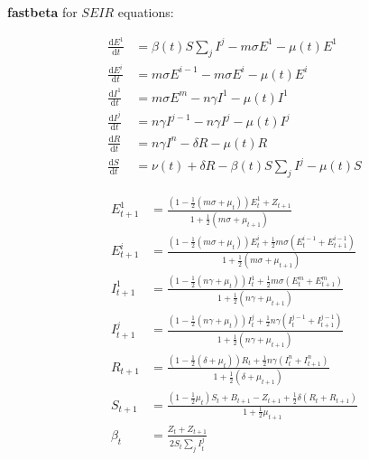 \documentclass{article}
\begin{document}
\setlength{\parindent}{0in}

\textbf{fastbeta} for $S E I R$ equations:

\begin{subequations}
\begin{align}
  \frac{\text{d} E^{1}}{\text{d} t}
  &= \beta(t) S \sum\nolimits_{j} I^{j} - m \sigma E^{1} - \mu(t) E^{1} \\
  \frac{\text{d} E^{i}}{\text{d} t}
  &= m \sigma E^{i-1} - m \sigma E^{i} - \mu(t) E^{i} \\
  \frac{\text{d} I^{1}}{\text{d} t}
  &= m \sigma E^{m} - n \gamma I^{1} - \mu(t) I^{1} \\
  \frac{\text{d} I^{j}}{\text{d} t}
  &= n \gamma I^{j-1} - n \gamma I^{j} - \mu(t) I^{j} \\
  \frac{\text{d} R}{\text{d} t}
  &= n \gamma I^{n} - \delta R - \mu(t) R \\
  \frac{\text{d} S}{\text{d} t}
  &= \nu(t) + \delta R - \beta(t) S \sum\nolimits_{j} I^{j} - \mu(t) S
\end{align}
\end{subequations}

\begin{subequations}
\begin{align}
  E_{t+1}^{1} &= \frac{(1 - \frac{1}{2} (m \sigma + \mu_{t})) E_{t}^{1} + Z_{t+1}}{1 + \frac{1}{2} (m \sigma + \mu_{t+1})} \\
  E_{t+1}^{i} &= \frac{(1 - \frac{1}{2} (m \sigma + \mu_{t})) E_{t}^{i} + \frac{1}{2} m \sigma (E_{t}^{i-1} + E_{t+1}^{i-1})}{1 + \frac{1}{2} (m \sigma + \mu_{t+1})} \\
  I_{t+1}^{1} &= \frac{(1 - \frac{1}{2} (n \gamma + \mu_{t})) I_{t}^{1} + \frac{1}{2} m \sigma (E_{t}^{m} + E_{t+1}^{m})}{1 + \frac{1}{2} (n \gamma + \mu_{t+1})} \\
  I_{t+1}^{j} &= \frac{(1 - \frac{1}{2} (n \gamma + \mu_{t})) I_{t}^{j} + \frac{1}{2} n \gamma (I_{t}^{j-1} + I_{t+1}^{j-1})}{1 + \frac{1}{2} (n \gamma + \mu_{t+1})} \\
  R_{t+1} &= \frac{(1 - \frac{1}{2} (\delta + \mu_{t})) R_{t} + \frac{1}{2} n \gamma (I_{t}^{n} + I_{t+1}^{n})}{1 + \frac{1}{2} (\delta + \mu_{t+1})} \\
  S_{t+1} &= \frac{(1 - \frac{1}{2} \mu_{t}) S_{t} + B_{t+1} - Z_{t+1} + \frac{1}{2} \delta (R_{t} + R_{t+1})}{1 + \frac{1}{2} \mu_{t+1}} \\
  \beta_{t} &= \frac{Z_{t} + Z_{t+1}}{2 S_{t} \sum\nolimits_{j} I_{t}^{j}}
\end{align}
\end{subequations}
\end{document}
